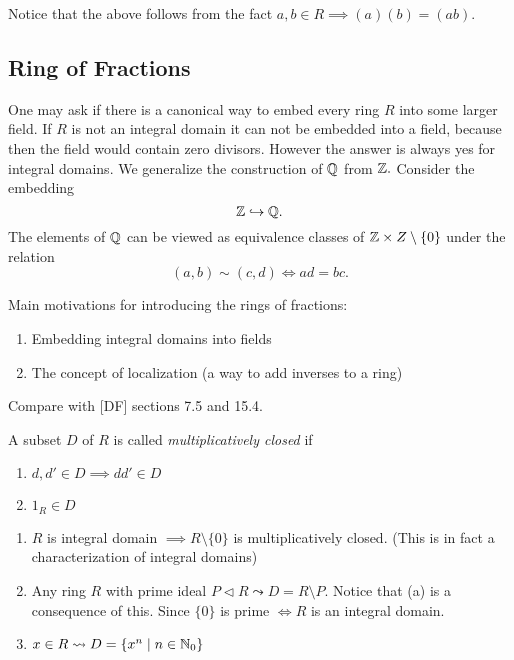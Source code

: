 \documentclass[master.tex]{subfiles}
\begin{document}
  Notice that the above follows from the fact \(a,b \in R \implies (a)(b)=(ab)\).

  \subsection{Ring of Fractions}
  One may ask if there is a canonical way to embed every ring \(R\) into some larger field. If \(R\) is not an integral
  domain it can not be embedded into a field, because then the field would contain zero divisors. However the answer is
  always yes for integral domains.  We generalize the construction of \({\mathbb Q}\) from \({\mathbb Z}.\) Consider the embedding
  \[{\mathbb Z} \hookrightarrow {\mathbb Q}.\]
  The elements of \({\mathbb Q}\) can be viewed as equivalence classes of \({\mathbb Z} \times Z \setminus \{0\}\) under the relation
  \[(a,b) \sim (c,d) \iff ad=bc.\]

  Main motivations for introducing the rings of fractions:
  \begin{enumerate}
  \item Embedding integral domains into fields
  \item The concept of localization (a way to add inverses to a ring)
  \end{enumerate}

  Compare with [DF] sections 7.5 and 15.4.

  \begin{defn}
    A subset \(D\) of \(R\) is called \emph{multiplicatively closed} if
    \begin{enumerate}[label=(\arabic*)]
    \item \(d,d' \in D \implies dd' \in D\)
    \item \(1_R \in D\)
    \end{enumerate}
  \end{defn}

  \begin{example*}
    \begin{enumerate}[label=(\alph*)]
    \item \(R\) is integral domain \(\implies R \setminus \{0\}\) is multiplicatively closed. (This is in fact a
      characterization of integral domains)
    \item Any ring \(R\) with prime ideal \(P \lhd R \leadsto D = R \setminus P\). Notice that (a) is a consequence of
      this. Since \(\{0\}\) is prime \(\iff R\) is an integral domain.
    \item \(x \in R \leadsto D= \{x^n \mid n \in {\mathbb N}_0\}\)
    \end{enumerate}
  \end{example*}
  
\end{document}
